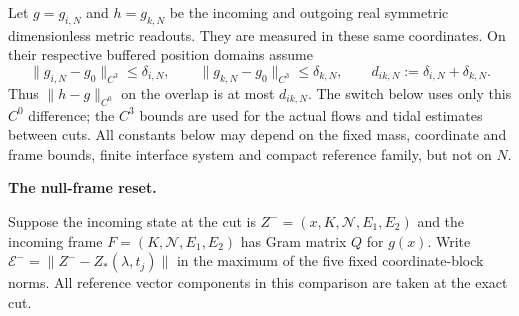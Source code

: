 \documentclass[
  english,
  11pt,
  reqno]{amsart}
\begin{document}
Let \(g=g_{i,N}\) and \(h=g_{k,N}\) be the incoming and outgoing real
symmetric dimensionless metric readouts. They are measured in these same
coordinates. On their respective buffered position domains assume \[
 \|g_{i,N}-g_0\|_{C^3}\le\delta_{i,N},\qquad
 \|g_{k,N}-g_0\|_{C^3}\le\delta_{k,N},\qquad
 d_{ik,N}:=\delta_{i,N}+\delta_{k,N}.
\] Thus \(\|h-g\|_{C^0}\) on the overlap is at most \(d_{ik,N}\). The
switch below uses only this \(C^0\) difference; the \(C^3\) bounds are
used for the actual flows and tidal estimates between cuts. All
constants below may depend on the fixed mass, coordinate and frame
bounds, finite interface system and compact reference family, but not on
\(N\).

\textbf{The null-frame reset.}

Suppose the incoming state at the cut is
\(Z^-=(x,K,\mathcal N,E_1,E_2)\) and the incoming frame
\(F=(K,\mathcal N,E_1,E_2)\) has Gram matrix \(Q\) for \(g(x)\). Write
\(\mathcal E^-=\|Z^--Z_*(\lambda,t_j)\|\) in the maximum of the five
fixed coordinate-block norms. All reference vector components in this
comparison are taken at the exact cut.
\end{document}
